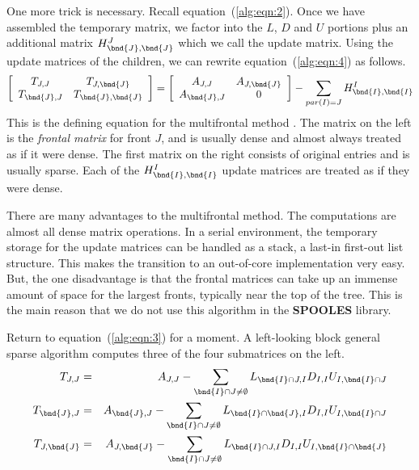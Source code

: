 One more trick is necessary.
Recall equation~(\ref{alg:eqn:2}).
Once we have assembled the temporary matrix, we factor into the
$L$, $D$ and $U$ portions plus an additional matrix
$H_{\bnd{J},\bnd{J}}^J$ which we call the update matrix.
Using the update matrices of the children, we can rewrite 
equation~(\ref{alg:eqn:4}) as follows.
\begin{equation}
\label{alg:eqn:mf}
\left \lbrack \begin{array}{cc}
T_{J,J} & T_{J, \bnd{J}} \\
T_{\bnd{J},J} & T_{\bnd{J},\bnd{J}}
\end{array} \right \rbrack
= 
\left \lbrack \begin{array}{cc}
A_{J,J} & A_{J, \bnd{J}} \\
A_{\bnd{J},J} & 0
\end{array} \right \rbrack
- 
\sum_{par(I) = J}
H_{\bnd{I},\bnd{I}}^I
\end{equation}
This is the defining equation for the multifrontal method
\cite{duf83-multifrontal}.
The matrix on the left is the {\it frontal matrix} for front $J$,
and is usually dense and almost always treated as if it were dense.
The first matrix on the right consists of original entries and is
usually sparse.
Each of the $H_{\bnd{I},\bnd{I}}^I$ update matrices are treated as
if they were dense.
\par
There are many advantages to the multifrontal method.
The computations are almost all dense matrix operations.
In a serial environment, the temporary storage for the update
matrices can be handled as a stack, a last-in first-out list
structure.
This makes the transition to an out-of-core implementation very easy.
But, the one disadvantage is that the frontal matrices can take up
an immense amount of space for the largest fronts, typically near
the top of the tree.
This is the main reason that we do not use this algorithm
in the {\bf SPOOLES} library.
\par
Return to equation~(\ref{alg:eqn:3}) for a moment.
A left-looking block general sparse algorithm computes three of the
four submatrices on the left.
\begin{eqnarray*}
T_{J,J} & = & A_{J,J}
- \sum_{\bnd{I} \cap J \ne \emptyset} 
L_{\bnd{I} \cap J, I} D_{I, I} U_{I, \bnd{I} \cap J}
\\
T_{\bnd{J},J} & = & A_{\bnd{J},J}
- \sum_{\bnd{I} \cap J \ne \emptyset} 
L_{\bnd{I} \cap \bnd{J}, I} D_{I, I} U_{I, \bnd{I} \cap J}
\\
T_{J,\bnd{J}} & = & A_{J,\bnd{J}}
- \sum_{\bnd{I} \cap J \ne \emptyset} 
L_{\bnd{I} \cap J, I} D_{I, I} U_{I, \bnd{I} \cap \bnd{J}}
\end{eqnarray*}

